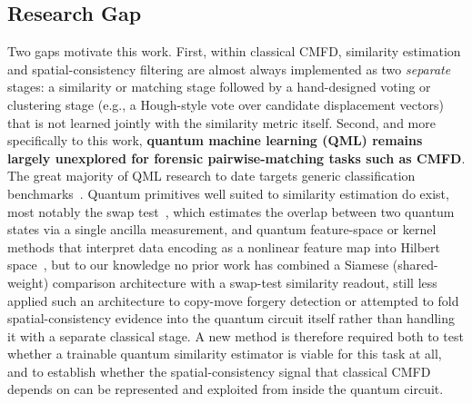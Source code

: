 \documentclass[conference]{IEEEtran}
\begin{document}
\subsection{Research Gap}
Two gaps motivate this work. First, within classical CMFD, similarity estimation and spatial-consistency filtering are almost always implemented as two \emph{separate} stages: a similarity or matching stage followed by a hand-designed voting or clustering stage (e.g., a Hough-style vote over candidate displacement vectors) that is not learned jointly with the similarity metric itself. Second, and more specifically to this work, \textbf{quantum machine learning (QML) remains largely unexplored for forensic pairwise-matching tasks such as CMFD}. The great majority of QML research to date targets generic classification benchmarks~\cite{biamonte2017}. Quantum primitives well suited to similarity estimation do exist, most notably the swap test~\cite{buhrman2001}, which estimates the overlap between two quantum states via a single ancilla measurement, and quantum feature-space or kernel methods that interpret data encoding as a nonlinear feature map into Hilbert space~\cite{schuld2019}, but to our knowledge no prior work has combined a Siamese (shared-weight) comparison architecture with a swap-test similarity readout, still less applied such an architecture to copy-move forgery detection or attempted to fold spatial-consistency evidence into the quantum circuit itself rather than handling it with a separate classical stage. A new method is therefore required both to test whether a trainable quantum similarity estimator is viable for this task at all, and to establish whether the spatial-consistency signal that classical CMFD depends on can be represented and exploited from inside the quantum circuit.
\end{document}
